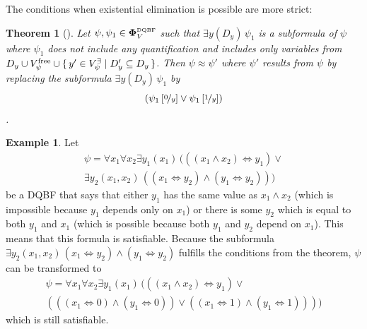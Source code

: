 \documentclass[
  digital, %
  twoside, %
  table,   %
  nolof,     %
  nolot,     %
]{fithesis3}
\let\setbuilder\set
\newcommand{\simpleset}[1]{\{{#1}\}}
\renewcommand{\set}[1]{\normalexpandarg\IfSubStr{#1}{|}{\setbuilder{#1}}{\simpleset{#1}}}
\newtheorem{theorem}{Theorem}[chapter] %
\theoremstyle{definition}
\newtheorem{example}{Example}
\theoremstyle{remark}
\newcommand{\substitute}[2]{\left[ \nicefrac{#2}{#1} \right]}
\newcommand{\DQBF}[1]{\mathbf{\Phi}_{#1}^{\normalfont{\text{\tiny DQBF}}}}
\newcommand{\lequal}{\Leftrightarrow}
\newcommand{\itholds}{\,}
\begin{document}
The conditions when existential elimination is possible are more strict:

\begin{theorem}[{\cite[Theorem 5]{HQSquantifierLocalization}}]
\label{thrm:exElim}
  Let $\psi, \psi_1 \in \DQBF{V}$ such that $\exists y(D_y)\itholds\psi_1$ is a subformula of $\psi$ where $\psi_1$ does not include any quantification and includes only variables from $D_y \cup V_{\psi}^{\text{free}} \cup \set{y' \in V_{\psi}^{\exists} | D_y' \subseteq D_y}$. Then $\psi \approx \psi'$ where $\psi'$ results from $\psi$ by replacing the subformula $\exists y(D_y)\itholds\psi_1$ by \[(\psi_1\substitute{y}{0} \lor \psi_1\substitute{y}{1})\].
\end{theorem}
\begin{example}
Let
\begin{multline*}
\psi = \forall x_1 \forall x_2 \exists y_1(x_1) \itholds (((x_1 \land x_2) \lequal y_1) \lor {} \\
\exists y_2 (x_1,x_2) \itholds ((x_1 \lequal y_2) \land (y_1 \lequal y_2)))
\end{multline*}
be a DQBF that says that either $y_1$ has the same value as $x_1 \land x_2$ (which is impossible because $y_1$ depends only on $x_1$) or there is some $y_2$ which is equal to both $y_1$ and $x_1$ (which is possible because both $y_1$ and $y_2$ depend on $x_1$). This means that this formula is satisfiable. Because the subformula $\exists y_2 (x_1,x_2) \itholds (x_1 \lequal y_2) \land (y_1 \lequal y_2)$ fulfills the conditions from the theorem, $\psi$ can be transformed to
\begin{multline*}
\psi = \forall x_1 \forall x_2 \exists y_1(x_1) \itholds (((x_1 \land x_2) \lequal y_1) \lor {}\\
(((x_1 \lequal 0) \land (y_1 \lequal 0)) \lor ((x_1 \lequal 1) \land (y_1 \lequal 1))))
\end{multline*}
which is still satisfiable.
\end{example}



\end{document}
